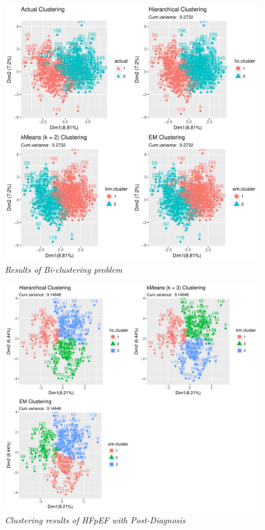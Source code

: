 \documentclass[../thesis.tex]{subfiles}
\begin{document}
\begin{figure}[h!]
    \centering
    \hspace*{-1cm}\includegraphics[width=1.1\textwidth]{doc/thesis/images/ClustFull.pdf}
    \caption[Clustering Results of Bi-clustering problem]{\textit{Results of Bi-clustering problem}}
    \label{fig:bi_clust_results}
\end{figure}

\newpage

\begin{figure}[h!]
    \centering
    \hspace*{-1cm}\includegraphics[width=1.1\textwidth]{doc/thesis/images/ClustpPhy.pdf}
    \caption[Clustering results of HFpEF with Post-Diagnosis]{\textit{Clustering results of HFpEF with Post-Diagnosis}}
    \label{fig:clust_results_with_post_p}
\end{figure}
\end{document}
